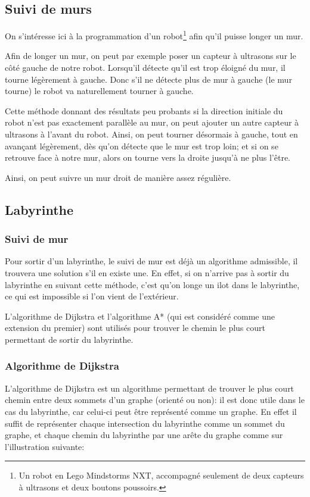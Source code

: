 \subsection{Suivi de murs}
  On s'intéresse ici à la programmation d'un robot\footnote{Un robot en Lego
  Mindstorms NXT, accompagné seulement de deux capteurs à ultrasons et
  deux boutons poussoirs.} afin qu'il puisse longer un mur.

  Afin de longer un mur, on peut par exemple poser un capteur à ultrasons sur
  le côté gauche de notre robot. Lorsqu'il détecte qu'il est trop
  éloigné du mur, il tourne légèrement à gauche. Donc s'il ne détecte plus
  de mur à gauche (le mur tourne) le robot va naturellement tourner à gauche.

  Cette méthode donnant des résultats peu probants si la direction initiale du
  robot n'est pas exactement parallèle au mur, on peut ajouter un autre capteur
  à ultrasons à l'avant du robot. Ainsi, on peut tourner désormais à gauche,
  tout en avançant légèrement, dès qu'on détecte que le mur est trop loin; et
  si on se retrouve face à notre mur, alors on tourne vers la droite jusqu'à ne
  plus l'être.

  Ainsi, on peut suivre un mur droit de manière assez régulière.

\subsection{Labyrinthe}\label{sec:laby}
  \subsubsection{Suivi de mur}
    Pour sortir d'un labyrinthe, le suivi de mur est déjà un algorithme
    admissible, il trouvera une solution s'il en existe une. En effet, si on
    n'arrive pas à sortir du labyrinthe en suivant cette méthode, c'est qu'on 
    longe un ilot dans le labyrinthe, ce qui est impossible si l'on vient
    de l'extérieur.

    L'algorithme de Dijkstra et l'algorithme A* (qui est considéré comme une
    extension du premier) sont utilisés pour trouver le chemin le plus court
    permettant de sortir du labyrinthe.

  \subsubsection{Algorithme de Dijkstra}
    L'algorithme de Dijkstra est un algorithme permettant de trouver le plus
    court chemin entre deux sommets d'un graphe (orienté ou non): il est donc
    utile dans le cas du labyrinthe, car celui-ci peut être représenté comme un
    graphe. En effet il suffit de représenter chaque intersection du labyrinthe
    comme un sommet du graphe, et chaque chemin du labyrinthe par une arête du
    graphe comme sur l'illustration suivante:

